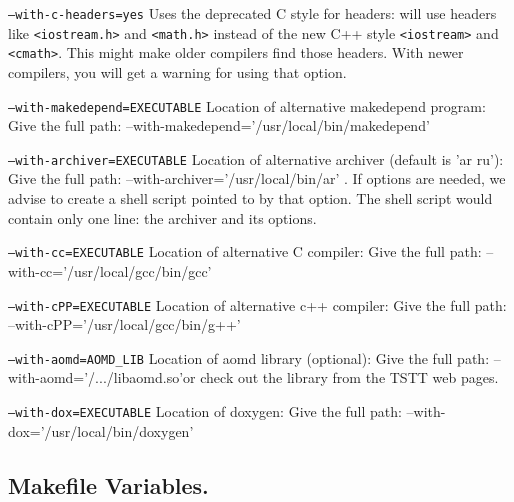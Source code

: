 \documentclass[letter]{report}
\begin{document}
\begin{description}
\item \texttt{--with-c-headers=yes} Uses the deprecated C style for headers:
  will use headers like \texttt{<iostream.h>} and \texttt{<math.h>}
  instead of the new C++ style \texttt{<iostream>} and \texttt{<cmath>}. This might make older
  compilers find those headers. With newer compilers, you will get a warning for using that option.
\item \texttt{--with-makedepend=EXECUTABLE} Location of alternative makedepend program:
Give the full path:  --with-makedepend='/usr/local/bin/makedepend'
\item \texttt{--with-archiver=EXECUTABLE} Location of alternative archiver (default is 'ar ru'):
Give the full path: --with-archiver='/usr/local/bin/ar' . If options are needed, we advise to
create a shell script pointed to by that option. The shell script would contain only one line: the
archiver and its options. 
\item \texttt{--with-cc=EXECUTABLE} Location of alternative C compiler:
Give the full path: --with-cc='/usr/local/gcc/bin/gcc'
\item \texttt{--with-cPP=EXECUTABLE} Location of alternative c++ compiler:
Give the full path:  --with-cPP='/usr/local/gcc/bin/g++'
\item \texttt{--with-aomd=AOMD\_LIB} Location of aomd library (optional):
Give the full path: --with-aomd='/.../libaomd.so'or check out the library from the
TSTT web pages.
\item \texttt{--with-dox=EXECUTABLE} Location of doxygen:
Give the full path: --with-dox='/usr/local/bin/doxygen'
\end{description}

\subsection{Makefile Variables.}  \label{mes_vars_and_defs}
\end{document}
